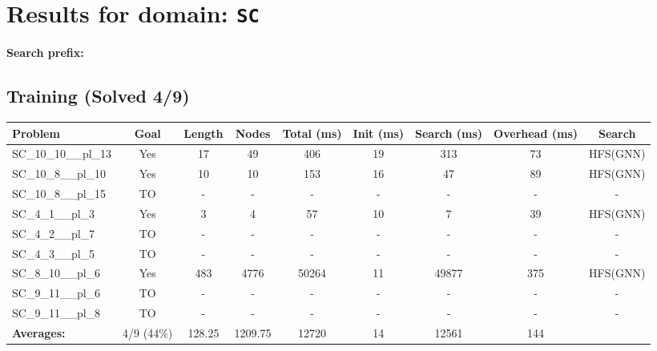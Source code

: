 \documentclass{article}
\begin{document}
\section*{Results for domain: \texttt{SC}}
\textbf{Search prefix:} 
\\[0.5cm]
\subsection*{Training (Solved 4/9)}
\begin{tabular}{lcccccccc}
\toprule
Problem & Goal & Length & Nodes & Total (ms) & Init (ms) & Search (ms) & Overhead (ms) & Search \\
\midrule
SC\_10\_10\_\_pl\_13 & Yes & 17 & 49 & 406 & 19 & 313 & 73 & HFS(GNN) \\
SC\_10\_8\_\_pl\_10 & Yes & 10 & 10 & 153 & 16 & 47 & 89 & HFS(GNN) \\
SC\_10\_8\_\_pl\_15 & TO & - & - & - & - & - & - & - \\
SC\_4\_1\_\_pl\_3 & Yes & 3 & 4 & 57 & 10 & 7 & 39 & HFS(GNN) \\
SC\_4\_2\_\_pl\_7 & TO & - & - & - & - & - & - & - \\
SC\_4\_3\_\_pl\_5 & TO & - & - & - & - & - & - & - \\
SC\_8\_10\_\_pl\_6 & Yes & 483 & 4776 & 50264 & 11 & 49877 & 375 & HFS(GNN) \\
SC\_9\_11\_\_pl\_6 & TO & - & - & - & - & - & - & - \\
SC\_9\_11\_\_pl\_8 & TO & - & - & - & - & - & - & - \\
\textbf{Averages:} & 4/9 (44\%) & 128.25 & 1209.75 & 12720 & 14 & 12561 & 144 & \\
\bottomrule
\end{tabular}
\\[0.7cm]
\end{document}
